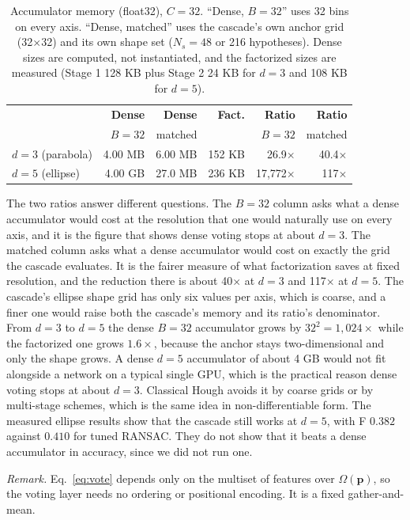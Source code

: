 \documentclass[11pt]{article}
\begin{document}
\begin{table}[t]
\centering
\caption{Accumulator memory (float32), $C=32$. ``Dense, $B=32$'' uses 32 bins on every axis. ``Dense, matched'' uses the cascade's own anchor grid (32$\times$32) and its own shape set ($N_s=48$ or 216 hypotheses). Dense sizes are computed, not instantiated, and the factorized sizes are measured (Stage 1 128 KB plus Stage 2 24 KB for $d=3$ and 108 KB for $d=5$).}
\label{tab:memory}
\small
\begin{tabular}{lrrrrr}
\toprule
& \textbf{Dense} & \textbf{Dense} & \textbf{Fact.} & \textbf{Ratio} & \textbf{Ratio} \\
& $B=32$ & matched & & $B=32$ & matched \\
\midrule
$d=3$ (parabola) & 4.00 MB & 6.00 MB & 152 KB & 26.9$\times$ & 40.4$\times$ \\
$d=5$ (ellipse)  & 4.00 GB & 27.0 MB & 236 KB & 17{,}772$\times$ & 117$\times$ \\
\bottomrule
\end{tabular}
\end{table}

The two ratios answer different questions. The $B=32$ column asks what a dense accumulator would cost at the resolution that one would naturally use on every axis, and it is the figure that shows dense voting stops at about $d=3$. The matched column asks what a dense accumulator would cost on exactly the grid the cascade evaluates. It is the fairer measure of what factorization saves at fixed resolution, and the reduction there is about 40$\times$ at $d=3$ and 117$\times$ at $d=5$. The cascade's ellipse shape grid has only six values per axis, which is coarse, and a finer one would raise both the cascade's memory and its ratio's denominator. From $d=3$ to $d=5$ the dense $B=32$ accumulator grows by $32^{2}=1{,}024\times$ while the factorized one grows $1.6\times$, because the anchor stays two-dimensional and only the shape grows. A dense $d=5$ accumulator of about 4 GB would not fit alongside a network on a typical single GPU, which is the practical reason dense voting stops at about $d=3$. Classical Hough avoids it by coarse grids or by multi-stage schemes, which is the same idea in non-differentiable form. The measured ellipse results show that the cascade still works at $d=5$, with F $0.382$ against $0.410$ for tuned RANSAC. They do not show that it beats a dense accumulator in accuracy, since we did not run one.

\emph{Remark.} Eq.~\ref{eq:vote} depends only on the multiset of features over $\Omega(\mathbf{p})$, so the voting layer needs no ordering or positional encoding. It is a fixed gather-and-mean.
\end{document}
